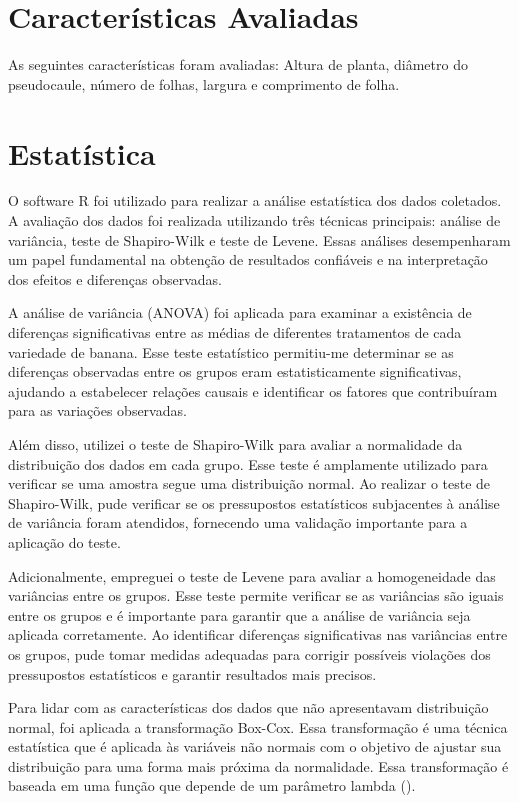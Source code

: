 \section{Características Avaliadas}
As seguintes características foram avaliadas: Altura de planta, diâmetro do pseudocaule, número de folhas, largura e comprimento de folha.

\section{Estatística}
O software R foi utilizado para realizar a análise estatística dos dados coletados. A avaliação dos dados foi realizada utilizando três técnicas principais: análise de variância, teste de Shapiro-Wilk e teste de Levene. Essas análises desempenharam um papel fundamental na obtenção de resultados confiáveis e na interpretação dos efeitos e diferenças observadas.

A análise de variância (ANOVA) foi aplicada para examinar a existência de diferenças significativas entre as médias de diferentes tratamentos de cada variedade de banana. Esse teste estatístico permitiu-me determinar se as diferenças observadas entre os grupos eram estatisticamente significativas, ajudando a estabelecer relações causais e identificar os fatores que contribuíram para as variações observadas.

Além disso, utilizei o teste de Shapiro-Wilk para avaliar a normalidade da distribuição dos dados em cada grupo. Esse teste é amplamente utilizado para verificar se uma amostra segue uma distribuição normal. Ao realizar o teste de Shapiro-Wilk, pude verificar se os pressupostos estatísticos subjacentes à análise de variância foram atendidos, fornecendo uma validação importante para a aplicação do teste.

Adicionalmente, empreguei o teste de Levene para avaliar a homogeneidade das variâncias entre os grupos. Esse teste permite verificar se as variâncias são iguais entre os grupos e é importante para garantir que a análise de variância seja aplicada corretamente. Ao identificar diferenças significativas nas variâncias entre os grupos, pude tomar medidas adequadas para corrigir possíveis violações dos pressupostos estatísticos e garantir resultados mais precisos.

Para lidar com as características dos dados que não apresentavam distribuição normal, foi aplicada a transformação Box-Cox. Essa transformação é uma técnica estatística que é aplicada às variáveis não normais com o objetivo de ajustar sua distribuição para uma forma mais próxima da normalidade. Essa transformação é baseada em uma função que depende de um parâmetro lambda (\lambda).